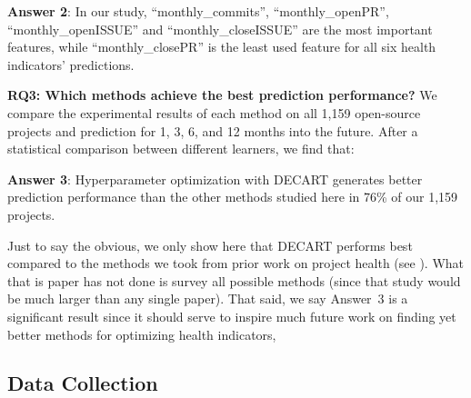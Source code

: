 \documentclass[smallextended]{svjour3}
\newcommand{\respto}[1]{
\fcolorbox{black}{black!15}{%
\label{resp:#1}%
\bf\scriptsize R{#1}}}
\newcommand{\BLUE}{\color{blue}}
\newcommand{\BLACK}{\color{black}}
\begin{document}
\begin{blockquote}
\noindent
\textbf{Answer 2}: In our study, ``monthly\_commits'', ``monthly\_openPR'', ``monthly\_openISSUE'' and ``monthly\_closeISSUE'' are the most important features, while ``monthly\_closePR'' is the least used feature for all six health indicators' predictions.
\end{blockquote}



\textbf{RQ3: Which methods achieve the best prediction performance?}
We compare the experimental results of each method on all 1,159 open-source projects and prediction for 1, 3, 6, and 12 months into the future. After a statistical comparison between different learners, we find that:  

\begin{blockquote}
\noindent
\textbf{Answer 3}: Hyperparameter optimization with DECART generates better prediction performance than the other methods studied here  in 76\% of our 1,159 projects.
\end{blockquote}


\respto{2G3} \BLUE Just to say the obvious, we only show here that DECART performs best
compared to the methods we took from prior work on project health (see ).
What that is paper has not done is survey all possible methods (since that study
would be much larger than any single paper).  That said, we say Answer~3 is a significant result since it should serve to inspire   much future work on finding yet better methods
for optimizing health indicators, 
\BLACK

\subsection{Data Collection}
\label{sect:data_collect}
\end{document}
